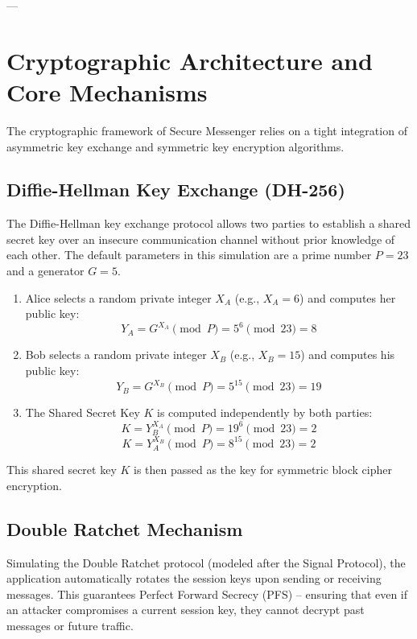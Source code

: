 \documentclass[12pt,a4paper]{article}
\begin{document}
---

\section{Cryptographic Architecture and Core Mechanisms}
The cryptographic framework of Secure Messenger relies on a tight integration of asymmetric key exchange and symmetric key encryption algorithms.

\subsection{Diffie-Hellman Key Exchange (DH-256)}
The Diffie-Hellman key exchange protocol allows two parties to establish a shared secret key over an insecure communication channel without prior knowledge of each other.
The default parameters in this simulation are a prime number $P = 23$ and a generator $G = 5$.
\begin{enumerate}
    \item Alice selects a random private integer $X_A$ (e.g., $X_A = 6$) and computes her public key:
    \begin{equation}
        Y_A = G^{X_A} \pmod P = 5^6 \pmod{23} = 8
    \end{equation}
    \item Bob selects a random private integer $X_B$ (e.g., $X_B = 15$) and computes his public key:
    \begin{equation}
        Y_B = G^{X_B} \pmod P = 5^{15} \pmod{23} = 19
    \end{equation}
    \item The Shared Secret Key $K$ is computed independently by both parties:
    \begin{equation}
        K = Y_B^{X_A} \pmod P = 19^6 \pmod{23} = 2
    \end{equation}
    \begin{equation}
        K = Y_A^{X_B} \pmod P = 8^{15} \pmod{23} = 2
    \end{equation}
\end{enumerate}
This shared secret key $K$ is then passed as the key for symmetric block cipher encryption.

\subsection{Double Ratchet Mechanism}
Simulating the Double Ratchet protocol (modeled after the Signal Protocol), the application automatically rotates the session keys upon sending or receiving messages. This guarantees Perfect Forward Secrecy (PFS) -- ensuring that even if an attacker compromises a current session key, they cannot decrypt past messages or future traffic.
\end{document}
